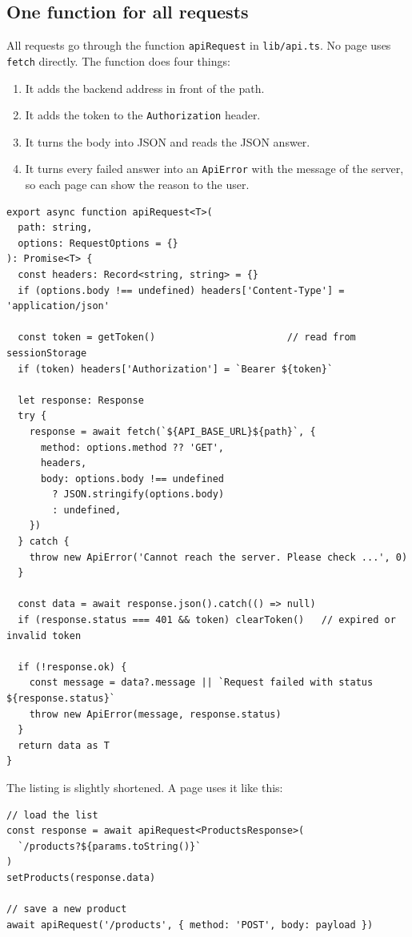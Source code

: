 \documentclass[11pt,a4paper]{article}
\newcommand{\code}[1]{\texttt{#1}}
\begin{document}
\subsection{One function for all requests}
All requests go through the function \code{apiRequest} in \code{lib/api.ts}. No page uses \code{fetch} directly. The function does four things:
\begin{enumerate}
  \item It adds the backend address in front of the path.
  \item It adds the token to the \code{Authorization} header.
  \item It turns the body into JSON and reads the JSON answer.
  \item It turns every failed answer into an \code{ApiError} with the message of the server, so each page can show the reason to the user.
\end{enumerate}
\begin{lstlisting}[style=query]
export async function apiRequest<T>(
  path: string,
  options: RequestOptions = {}
): Promise<T> {
  const headers: Record<string, string> = {}
  if (options.body !== undefined) headers['Content-Type'] = 'application/json'

  const token = getToken()                       // read from sessionStorage
  if (token) headers['Authorization'] = `Bearer ${token}`

  let response: Response
  try {
    response = await fetch(`${API_BASE_URL}${path}`, {
      method: options.method ?? 'GET',
      headers,
      body: options.body !== undefined
        ? JSON.stringify(options.body)
        : undefined,
    })
  } catch {
    throw new ApiError('Cannot reach the server. Please check ...', 0)
  }

  const data = await response.json().catch(() => null)
  if (response.status === 401 && token) clearToken()   // expired or invalid token

  if (!response.ok) {
    const message = data?.message || `Request failed with status ${response.status}`
    throw new ApiError(message, response.status)
  }
  return data as T
}
\end{lstlisting}
The listing is slightly shortened. A page uses it like this:
\begin{lstlisting}[style=query]
// load the list
const response = await apiRequest<ProductsResponse>(
  `/products?${params.toString()}`
)
setProducts(response.data)

// save a new product
await apiRequest('/products', { method: 'POST', body: payload })
\end{lstlisting}
\end{document}
